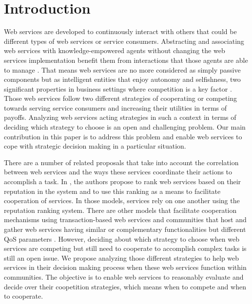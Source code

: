 \documentclass[fleqn]{singlecol-new}
\begin{document}
\section{Introduction}\label{Introduction}
Web services are developed to continuously interact with others
that could be different types of web services or service
consumers. Abstracting and associating web services with
knowledge-empowered agents without changing the web services
implementation benefit them from interactions that those agents
are able to manage \cite{Jacyno,Khosravifar1,Yassine}. That means
web services are no more considered as simply passive components
but as intelligent entities that enjoy autonomy and selfishness,
two significant properties in business settings where competition
is a key factor \cite{Jurca2,Khosravifar2}. Those web services
follow two different strategies of cooperating or competing
towards serving service consumers and increasing their utilities
in terms of payoffs. Analyzing web services acting strategies in
such a context in terms of deciding which strategy to choose is an
open and challenging problem. Our main contribution in this paper
is to address this problem and enable web services to cope with
strategic decision making in a particular situation.

There are a number of related proposals that take into account the
correlation between web services and the ways these services
coordinate their actions to accomplish a task. In
\cite{Jurca,Jurca2,Kalepu,Malik,Maximilien1}, the authors propose
to rank web services based on their reputation in the system and
to use this ranking as a means to facilitate cooperation of
services. In those models, services rely on one another using the
reputation ranking system. There are other models that facilitate
cooperation mechanisms using transaction-based web services
\cite{Rosario} and communities that host and gather web services
having similar or complementary functionalities but different QoS
parameters
\cite{Khosravifar1}. %
However, deciding about which strategy to choose when web services
are competing but still need to cooperate to accomplish complex
tasks is still an open issue. We propose analyzing those different
strategies to help web services in their decision making process
when these
web services function within communities. %
The objective is to enable web services to reasonably evaluate and
decide over their coopetition strategies, which means when to
compete and when to cooperate.
\end{document}
